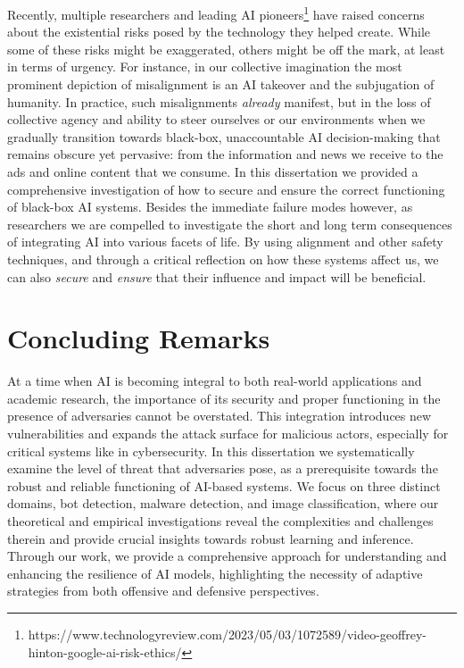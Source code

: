 Recently, multiple researchers and leading \gls{AI} pioneers\footnote{https://www.technologyreview.com/2023/05/03/1072589/video-geoffrey-hinton-google-ai-risk-ethics/} have raised concerns about the existential risks posed by the technology they helped create.
While some of these risks might be exaggerated, others might be off the mark, at least in terms of urgency.
For instance, in our collective imagination the most prominent depiction of misalignment is an \gls{AI} takeover and the subjugation of humanity.
In practice, such misalignments \textit{already} manifest, but in the loss of collective agency and ability to steer ourselves or our environments when we gradually transition towards black-box, unaccountable \gls{AI} decision-making that remains obscure yet pervasive: from the information and news we receive to the ads and online content that we consume.
In this dissertation we provided a comprehensive investigation of how to secure and ensure the correct functioning of black-box \gls{AI} systems.
Besides the immediate failure modes however, as researchers we are compelled to investigate the short and long term consequences of integrating \gls{AI} into various facets of life.
By using alignment and other safety techniques, and through a critical reflection on how these systems affect us, we can also \textit{secure} and \textit{ensure} that their influence and impact will be beneficial.

\section{Concluding Remarks}

At a time when \gls{AI} is becoming integral to both real-world applications and academic research, the importance of its security and proper functioning in the presence of adversaries cannot be overstated.
This integration introduces new vulnerabilities and expands the attack surface for malicious actors, especially for critical systems like in cybersecurity. 
In this dissertation we systematically examine the level of threat that adversaries pose, as a prerequisite towards the robust and reliable functioning of AI-based systems.
We focus on three distinct domains, bot detection, malware detection, and image classification, where our theoretical and empirical investigations reveal the complexities and challenges therein and provide crucial insights towards robust learning and inference.
Through our work, we provide a comprehensive approach for understanding and enhancing the resilience of AI models, highlighting the necessity of adaptive strategies from both offensive and defensive perspectives.

